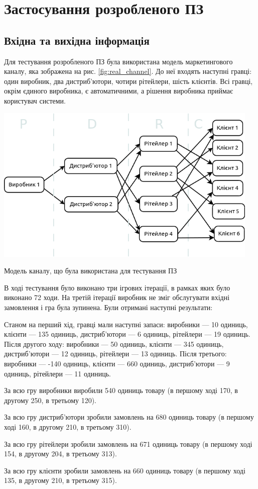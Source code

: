 \section{Застосування розробленого ПЗ}
\subsection{Вхідна та вихідна інформація}

Для тестування розробленого ПЗ була використана модель маркетингового каналу, яка зображена на рис. \ref{fig:real_channel}. До неї входять наступні гравці: один виробник, два дистриб’ютори, чотири рітейлери, шість клієнтів. Всі гравці, окрім єдиного виробника, є автоматичними, а рішення виробника приймає користувач системи.

\begin{stdfigure}
    \includegraphics[width=5in]{images/real_channel.png}
    \caption{Модель каналу, що була використана для тестування ПЗ}
    \label{fig:real_channel}
\end{stdfigure}

В ході тестування було виконано три ігрових ітерації, в рамках яких було виконано 72 ходи. На третій ітерації виробник не зміг обслугувати вхідні замовлення і гра була зупинена. Були отримані наступні результати:
\begin{longEnumerate}
\item Станом на перший хід, гравці мали наступні запаси: виробники --- 10 одиниць, клієнти --- 135 одиниць, дистриб’ютори --- 6 одиниць, рітейлери --- 19 одиниць. Після другого ходу: виробники --- 50 одиниць, клієнти --- 345 одиниць, дистриб’ютори --- 12 одиниць, рітейлери --- 13 одиниць. Після третього: виробники --- -140 одиниць, клієнти --- 660 одиниць, дистриб’ютори --- 9 одиниць, рітейлери --- 11 одиниць.
\item За всю гру виробники виробили 540 одиниць товару (в першому ході 170, в другому 250, в третьому 120).
\item За всю гру дистриб’ютори зробили замовлень на 680 одиниць товару (в першому ході 160, в другому 210, в третьому 310).
\item За всю гру рітейлери зробили замовлень на 671 одиниць товару (в першому ході 154, в другому 204, в третьому 313).
\item За всю гру клієнти зробили замовлень на 660 одиниць товару (в першому ході 135, в другому 210, в третьому 315).
\end{longEnumerate}

